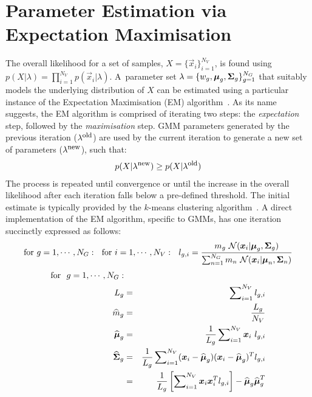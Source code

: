 \section{Parameter Estimation via Expectation Maximisation}


\noindent
The overall likelihood for a set of samples, $X=\{\Vec{x}_i\}_{i=1}^{N_V}$,
is found using $p(X | \lambda) = \prod\nolimits_{i=1}^{N_V} p(\Vec{x}_i | \lambda)$.
A~parameter set $\lambda = \{ w_g, {\boldsymbol{\mu}}_g, {\boldsymbol{\Sigma}}_g \}_{g=1}^{N_G}$
that suitably models the underlying distribution of $X$ can be estimated using a particular instance of the Expectation Maximisation (EM) algorithm~\cite{Dempster77, McLachlan-2008, Moon96, Redner84}.
As its name suggests, the EM algorithm is comprised of iterating two steps: the {\it expectation} step, followed by the {\it maximisation} step.
GMM parameters generated by the previous iteration ($\lambda^{\mbox{\footnotesize old}}$) are used
by the current iteration to generate a new set of parameters ($\lambda^{\mbox{\footnotesize new}}$), such that:
%
\begin{eqnarray}
	p(X|\lambda^{\mbox{\footnotesize new}}) \geq p(X|\lambda^{\mbox{\footnotesize old}})
\end{eqnarray}
%
The process is repeated until convergence or until the increase in the overall likelihood after each iteration falls below a pre-defined threshold.
The initial estimate is typically provided by the $k$-means clustering algorithm~\cite{Duda01}.
A direct implementation of the EM algorithm, specific to GMMs, has one iteration succinctly expressed as follows:
%
\begin{eqnarray}
%
\mbox{for} ~ g=1, \cdots,N_G: ~~ \mbox{for} ~i=1, \cdots, N_V:  ~~ l_{g,i} = \frac{m_g ~ {{\mathcal{N}}}( \Vec{x}_i | \Vec{\mu}_g, \Mat{\Sigma}_g )}
														{\sum\nolimits_{n=1}^{N_G} m_n ~ {{\mathcal{N}}}( \Vec{x}_i | \Vec{\mu}_n, \Mat{\Sigma}_n )}
%
\end{eqnarray}
%
\begin{eqnarray}
%
\mbox{for} ~~ g  =  1, \cdots, N_G:  \nonumber \\
	L_g & = & \sum\nolimits_{i=1}^{N_V} l_{g,i} \label{eqn:L_k} \\
	\widehat{m}_g & = & \frac{L_g}{N_V} \label{eqn:m_k} \\
	\widehat{\Vec{\mu}}_g & = & \frac{1}{L_g} \sum\nolimits_{i=1}^{N_V} \Vec{x}_i ~ l_{g,i}  \label{eqn:em_mean} \\
	\widehat{\Mat{\Sigma}}_g & = & \frac{1}{L_g} \sum\nolimits_{i=1}^{N_V} (\Vec{x}_i - \widehat{\Vec{\mu}}_g)(\Vec{x}_i - \widehat{\Vec{\mu}}_g)^T l_{g,i} \label{eqn:em_covA} \\
	& = &  \frac{1}{L_g} \left[ \sum\nolimits_{i=1}^{N_V} \Vec{x}_i \Vec{x}_i^T l_{g,i} \right] - \widehat{\Vec{\mu}}_g \widehat{\Vec{\mu}}_g^T \label{eqn:em_covB} \\
\end{eqnarray}

